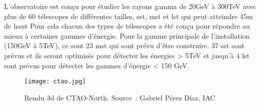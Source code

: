 L'observatoire est conçu pour étudier les rayons gamma de 20GeV à 300TeV avec plus de 60 télescopes de différentes tailles, \gls{sst}, \gls{mst} et \gls{lst} qui peut atteindre 45m de haut
Pour cela chacun des types de télescopes a été conçu pour répondre au mieux à certaines gammes d'énergie.
Pour la gamme principale de l'installation (150GeV à 5TeV), ce sont 23 \gls{mst} qui sont prévu d'être construire.
37 \gls{sst} sont prévus et ils seront optimisés pour détecter les énergies > 5TeV et jusqu'à 4 \gls{lst} sont prévus pour détecter les gammes d'énergie < 150 GeV.

\begin{figure}[tbph!]
	\centering
	\texttt{[image: ctao.jpg]}
	\caption[Rendu 3d de CTAO-North]{Rendu 3d de CTAO-North. Source : Gabriel Pérez Díaz, IAC \cite{CtaoImage}}
\end{figure}


